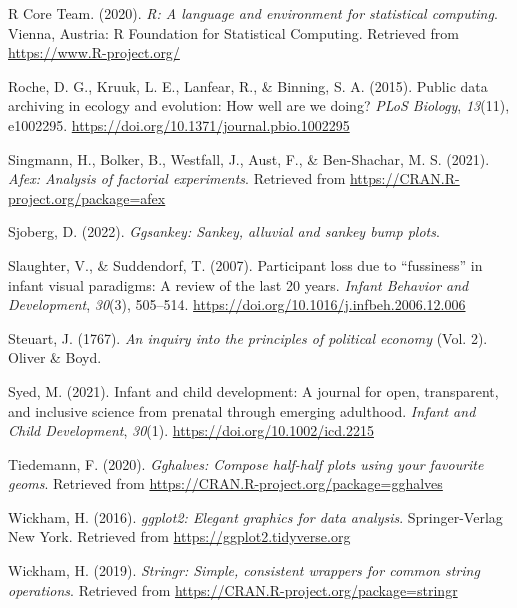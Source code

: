 \documentclass[
  english,
  man,floatsintext]{apa6}
\newlength{\cslhangindent}
\newlength{\cslentryspacingunit} %
\newenvironment{CSLReferences}[2] %
 {%
  \setlength{\parindent}{0pt}
  \ifodd #1
  \let\oldpar\par
  \def\par{\hangindent=\cslhangindent\oldpar}
  \fi
  \setlength{\parskip}{#2\cslentryspacingunit}
 }%
 {}
\begin{document}
\begin{CSLReferences}{1}{0}
\leavevmode{}%
R Core Team. (2020). \emph{R: A language and environment for statistical computing}. Vienna, Austria: R Foundation for Statistical Computing. Retrieved from \url{https://www.R-project.org/}

\leavevmode{}%
Roche, D. G., Kruuk, L. E., Lanfear, R., \& Binning, S. A. (2015). Public data archiving in ecology and evolution: How well are we doing? \emph{PLoS Biology}, \emph{13}(11), e1002295. \url{https://doi.org/10.1371/journal.pbio.1002295}

\leavevmode{}%
Singmann, H., Bolker, B., Westfall, J., Aust, F., \& Ben-Shachar, M. S. (2021). \emph{Afex: Analysis of factorial experiments}. Retrieved from \url{https://CRAN.R-project.org/package=afex}

\leavevmode{}%
Sjoberg, D. (2022). \emph{Ggsankey: Sankey, alluvial and sankey bump plots}.

\leavevmode{}%
Slaughter, V., \& Suddendorf, T. (2007). Participant loss due to {``fussiness''} in infant visual paradigms: A review of the last 20 years. \emph{Infant Behavior and Development}, \emph{30}(3), 505--514. \url{https://doi.org/10.1016/j.infbeh.2006.12.006}

\leavevmode{}%
Steuart, J. (1767). \emph{An inquiry into the principles of political economy} (Vol. 2). Oliver \& Boyd.

\leavevmode{}%
Syed, M. (2021). Infant and child development: A journal for open, transparent, and inclusive science from prenatal through emerging adulthood. \emph{Infant and Child Development}, \emph{30}(1). \url{https://doi.org/10.1002/icd.2215}

\leavevmode{}%
Tiedemann, F. (2020). \emph{Gghalves: Compose half-half plots using your favourite geoms}. Retrieved from \url{https://CRAN.R-project.org/package=gghalves}

\leavevmode{}%
Wickham, H. (2016). \emph{ggplot2: Elegant graphics for data analysis}. Springer-Verlag New York. Retrieved from \url{https://ggplot2.tidyverse.org}

\leavevmode{}%
Wickham, H. (2019). \emph{Stringr: Simple, consistent wrappers for common string operations}. Retrieved from \url{https://CRAN.R-project.org/package=stringr}


\end{CSLReferences}
\end{document}
